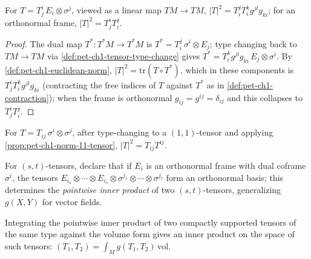 \begin{proposition}
  \label{prop:pet-ch1-norm-11-tensor}
  \leanok
  For $T=T^i_j\,E_i\otimes\sigma^j$, viewed as a linear map $TM\to TM$,
  $|T|^2=T^j_iT^k_ig^{jl}g_{ki}$; for an orthonormal frame,
  $|T|^2=T^i_jT^j_i$.
\end{proposition}
\begin{proof}
  \leanok
  The dual map $T^*:T^*M\to T^*M$ is $T^*=T^j_i\,\sigma^i\otimes E_j$; type
  changing back to $TM\to TM$ via
  \cref{def:pet-ch1-tensor-type-change} gives
  $T^*=T^k_ig^{jl}g_{ki}\,E_j\otimes\sigma^i$. By
  \cref{def:pet-ch1-euclidean-norm}, $|T|^2=\mathrm{tr}(T\circ T^*)$, which in
  these components is $T^i_jT^k_ig^{jl}g_{ki}$ (contracting the free indices of
  $T$ against $T^*$ as in \cref{def:pet-ch1-contraction}); when the frame is
  orthonormal $g_{ij}=g^{ij}=\delta_{ij}$ and this collapses to $T^i_jT^j_i$.
\end{proof}

\begin{proposition}
  \label{prop:pet-ch1-norm-02-tensor}
  \leanok
  For $T=T_{ij}\,\sigma^i\otimes\sigma^j$, after type-changing to a $(1,1)$-tensor
  and applying \cref{prop:pet-ch1-norm-11-tensor}, $|T|^2=T_{ij}T^{ij}$.
\end{proposition}

\begin{definition}
  \label{def:pet-ch1-pointwise-tensor-inner}
  \leanok
  For $(s,t)$-tensors, declare that if $E_i$ is an orthonormal frame with dual
  coframe $\sigma^i$, the tensors $E_{i_1}\otimes\cdots\otimes E_{i_s}\otimes
  \sigma^{j_1}\otimes\cdots\otimes\sigma^{j_t}$ form an orthonormal basis; this
  determines the \emph{pointwise inner product} of two $(s,t)$-tensors,
  generalizing $g(X,Y)$ for vector fields.
\end{definition}

\begin{definition}
  \label{def:pet-ch1-l2-tensor-inner}
  \leanok
  Integrating the pointwise inner product of two compactly supported tensors of
  the same type against the volume form gives an inner product on the space of
  such tensors: $(T_1,T_2)=\int_Mg(T_1,T_2)\,\mathrm{vol}$.
\end{definition}

